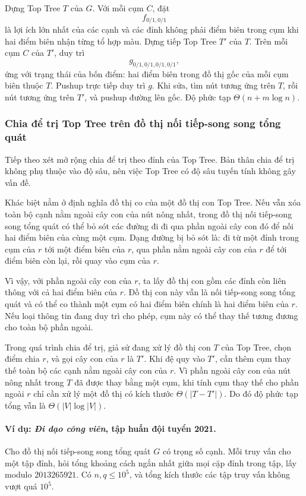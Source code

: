 \documentclass[11pt]{article}
\begin{document}
Dựng Top Tree \(T\) của \(G\). Với mỗi cụm \(C\), đặt
\[
  f_{0/1,0/1}
\]
là lợi ích lớn nhất của các cạnh và các đỉnh không phải điểm biên trong cụm
khi hai điểm biên nhận từng tổ hợp màu. Dựng tiếp Top Tree \(T'\) của \(T\).
Trên mỗi cụm \(C\) của \(T'\), duy trì
\[
  g_{0/1,0/1,0/1,0/1},
\]
ứng với trạng thái của bốn điểm: hai điểm biên trong đồ thị gốc của mỗi cụm
biên thuộc \(T\). Pushup trực tiếp duy trì \(g\). Khi sửa, tìm nút tương ứng
trên \(T\), rồi nút tương ứng trên \(T'\), và pushup đường lên gốc. Độ phức
tạp \(\Theta(n+m\log n)\).

\subsubsection{Chia để trị Top Tree trên đồ thị nối tiếp-song song tổng quát}

Tiếp theo xét mở rộng chia để trị theo đỉnh của Top Tree. Bản thân chia để trị
không phụ thuộc vào độ sâu, nên việc Top Tree có độ sâu tuyến tính không gây
vấn đề.

Khác biệt nằm ở định nghĩa đồ thị co của một đồ thị con Top Tree. Nếu vẫn xóa
toàn bộ cạnh nằm ngoài cây con của nút nông nhất, trong đồ thị nối tiếp-song
song tổng quát có thể bỏ sót các đường đi đi qua phần ngoài cây con đó để nối
hai điểm biên của cùng một cụm. Dạng đường bị bỏ sót là: đi từ một đỉnh trong
cụm của \(r\) tới một điểm biên của \(r\), qua phần nằm ngoài cây con của
\(r\) để tới điểm biên còn lại, rồi quay vào cụm của \(r\).

Vì vậy, với phần ngoài cây con của \(r\), ta lấy đồ thị con gồm các đỉnh còn
liên thông với cả hai điểm biên của \(r\). Đồ thị con này vẫn là nối tiếp-song
song tổng quát và có thể co thành một cụm có hai điểm biên chính là hai điểm
biên của \(r\). Nếu loại thông tin đang duy trì cho phép, cụm này có thể thay
thế tương đương cho toàn bộ phần ngoài.

Trong quá trình chia để trị, giả sử đang xử lý đồ thị con \(T\) của Top Tree,
chọn điểm chia \(r\), và gọi cây con của \(r\) là \(T'\). Khi đệ quy vào
\(T'\), cần thêm cụm thay thế toàn bộ các cạnh nằm ngoài cây con của \(r\). Vì
phần ngoài cây con của nút nông nhất trong \(T\) đã được thay bằng một cụm, khi
tính cụm thay thế cho phần ngoài \(r\) chỉ cần xử lý một đồ thị có kích thước
\(\Theta(|T-T'|)\). Do đó độ phức tạp tổng vẫn là \(\Theta(|V|\log |V|)\).

\paragraph{Ví dụ: \emph{Đi dạo công viên}, tập huấn đội tuyển 2021.}
Cho đồ thị nối tiếp-song song tổng quát \(G\) có trọng số cạnh. Mỗi truy vấn
cho một tập đỉnh, hỏi tổng khoảng cách ngắn nhất giữa mọi cặp đỉnh trong tập,
lấy modulo \(2013265921\). Có \(n,q\le 10^5\), và tổng kích thước các tập truy
vấn không vượt quá \(10^5\).
\end{document}
